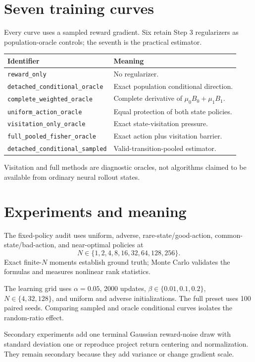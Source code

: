 \documentclass[10pt,a4paper]{article}
\begin{document}
\section{Seven training curves}
Every curve uses a sampled reward gradient. Six retain Step 3 regularizers as
population-oracle controls; the seventh is the practical estimator.
\begin{center}\small
\begin{tabularx}{\textwidth}{lX}
\toprule
Identifier & Meaning \\ \midrule
\texttt{reward\_only} & No regularizer. \\
\texttt{detached\_conditional\_oracle} & Exact population conditional direction. \\
\texttt{complete\_weighted\_oracle} & Complete derivative of $\mu_0B_0+\mu_1B_1$. \\
\texttt{uniform\_action\_oracle} & Equal protection of both state policies. \\
\texttt{visitation\_only\_oracle} & Exact state-visitation pressure. \\
\texttt{full\_pooled\_fisher\_oracle} & Exact action plus visitation barrier. \\
\texttt{detached\_conditional\_sampled} & Valid-transition-pooled estimator. \\
\bottomrule
\end{tabularx}
\end{center}
Visitation and full methods are diagnostic oracles, not algorithms claimed to
be available from ordinary neural rollout states.

\section{Experiments and meaning}
The fixed-policy audit uses uniform, adverse, rare-state/good-action,
common-state/bad-action, and near-optimal policies at
\begin{equation}
N\in\{1,2,4,8,16,32,64,128,256\}.
\end{equation}
Exact finite-$N$ moments establish ground truth; Monte Carlo validates the
formulas and measures nonlinear rank statistics.

The learning grid uses $\alpha=0.05$, 2000 updates,
$\beta\in\{0.01,0.1,0.2\}$, $N\in\{4,32,128\}$, and uniform and adverse
initializations. The full preset uses 100 paired seeds. Comparing sampled and
oracle conditional curves isolates the random-ratio effect.

Secondary experiments add one terminal Gaussian reward-noise draw with
standard deviation one or reproduce project return centering and normalization.
They remain secondary because they add variance or change gradient scale.
\end{document}
